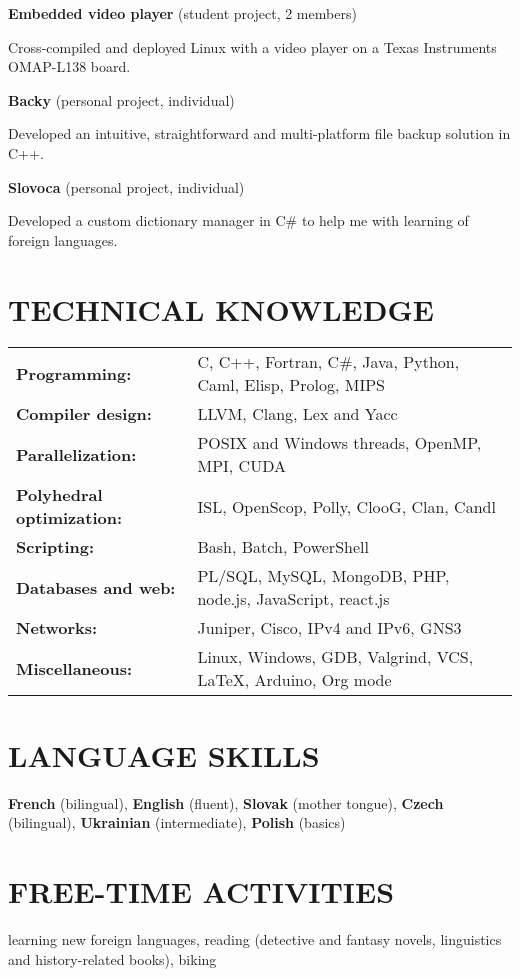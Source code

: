 \documentclass[a4paper, 11pt]{article}
\begin{document}
\vspace{.7em}

\textbf{Embedded video player} (student project, 2 members)

Cross-compiled and deployed Linux with a video player on a Texas Instruments
OMAP-L138 board.

\vspace{.7em}

\textbf{Backy} (personal project, individual)

Developed an intuitive, straightforward and multi-platform file backup solution
in C++.

\vspace{.7em}

\textbf{Slovoca} (personal project, individual)

Developed a custom dictionary manager in C\# to help me with learning of foreign
languages.

\section*{TECHNICAL KNOWLEDGE}

\begin{tabularx}{\linewidth}{lX}
  \textbf{Programming:} & C, C++, Fortran, C\#, Java, Python, Caml, Elisp,
  Prolog, MIPS \\
  \textbf{Compiler design:} & LLVM, Clang, Lex and Yacc \\
  \textbf{Parallelization:} & POSIX and Windows threads, OpenMP, MPI, CUDA \\
  \textbf{Polyhedral optimization:} & ISL, OpenScop, Polly, ClooG, Clan,
  Candl \\
  \textbf{Scripting:} & Bash, Batch, PowerShell \\
  \textbf{Databases and web:} &  PL/SQL, MySQL, MongoDB, PHP, node.js,
  JavaScript, react.js \\
  \textbf{Networks:} & Juniper, Cisco, IPv4 and IPv6, GNS3 \\
  \textbf{Miscellaneous:} & Linux, Windows, GDB, Valgrind, VCS, \LaTeX, Arduino,
  Org mode \\
\end{tabularx}

\section*{LANGUAGE SKILLS}

\textbf{French} (bilingual), \textbf{English} (fluent), \textbf{Slovak} (mother
tongue), \textbf{Czech} (bilingual), \textbf{Ukra\-ini\-an} (intermediate),
\textbf{Polish} (basics)

\section*{FREE-TIME ACTIVITIES}

learning new foreign languages, reading (detective and fantasy novels,
linguistics and history-related books), biking
\end{document}
